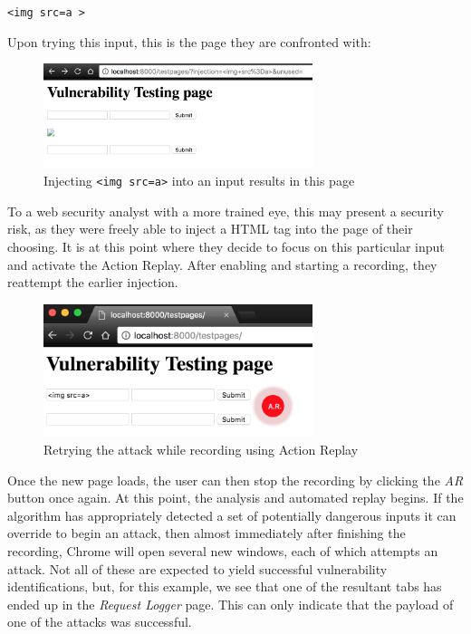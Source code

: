 \begin{center}
	\texttt{<img src=a >} 
\end{center}

Upon trying this input, this is the page they are confronted with:

\begin{figure}[h]
	\centering
	\includegraphics[width=0.7\textwidth]{images/action_replay_initial.png}
	\caption{Injecting \texttt{<img src=a>} into an input results in this page}
	\label{fig:action_replay_initial}
\end{figure}

To a web security analyst with a more trained eye, this may present a security risk, as they were freely able to inject a HTML tag into the page of their choosing. It is at this point where they decide to focus on this particular input and activate the Action Replay. After enabling and starting a recording, they reattempt the earlier injection. \\

\begin{figure}[h]
	\centering
	\includegraphics[width=0.7\textwidth]{images/action_replay_attack.png}
	\caption{Retrying the attack while recording using Action Replay}
	\label{fig:action_replay_attack}
\end{figure}

Once the new page loads, the user can then stop the recording by clicking the \textit{AR} button once again. At this point, the analysis and automated replay begins. If the algorithm has appropriately detected a set of potentially dangerous inputs it can override to begin an attack, then almost immediately after finishing the recording, Chrome will open several new windows, each of which attempts an attack. Not all of these are expected to yield successful vulnerability identifications, but, for this example, we see that one of the resultant tabs has ended up in the \textit{Request Logger} page. This can only indicate that the payload of one of the attacks was successful. \\ 


